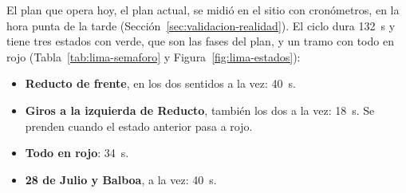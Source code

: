 El plan que opera hoy, el plan actual, se midió en el sitio con
cronómetros, en la hora punta de la tarde
(Sección~\ref{sec:validacion-realidad}). El ciclo dura 132~s y tiene
tres estados con verde, que son las fases del plan, y un tramo con todo
en rojo
(Tabla~\ref{tab:lima-semaforo} y Figura~\ref{fig:lima-estados}):
\begin{itemize}
  \item \textbf{Reducto de frente}, en los dos sentidos a la vez: 40~s.
  \item \textbf{Giros a la izquierda de Reducto}, también los dos a la
    vez: 18~s. Se prenden cuando el estado anterior pasa a rojo.
  \item \textbf{Todo en rojo}: 34~s.
  \item \textbf{28 de Julio y Balboa}, a la vez: 40~s.
\end{itemize}

\begin{table}[!tbp]
\centering
\footnotesize

\caption[Caso Lima, el nudo: estados del semáforo]{Caso Lima, el nudo: estados del semáforo, en su orden, con el verde del plan actual, el del fijo ajustado al segundo de cada demanda y el verde mínimo que puede dar cualquier control. Tras cada verde hay 3~s de ámbar y, tras los giros a la izquierda, 34~s con todo en rojo; esos tiempos son iguales en todos los controles.}
\label{tab:lima-semaforo}
\end{table}

